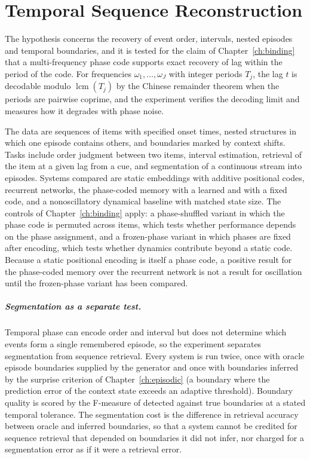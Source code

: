 \chapter{Temporal Sequence Reconstruction}\label{ch:sequence}

The hypothesis concerns the recovery of event order, intervals, nested episodes and temporal boundaries, and it is tested for the claim of Chapter~\ref{ch:binding} that a multi-frequency phase code supports exact recovery of lag within the period of the code. For frequencies $\omega_1,\dots,\omega_J$ with integer periods $T_j$, the lag $t$ is decodable modulo $\operatorname{lcm}(T_j)$ by the Chinese remainder theorem when the periods are pairwise coprime, and the experiment verifies the decoding limit and measures how it degrades with phase noise.

The data are sequences of items with specified onset times, nested structures in which one episode contains others, and boundaries marked by context shifts. Tasks include order judgment between two items, interval estimation, retrieval of the item at a given lag from a cue, and segmentation of a continuous stream into episodes. Systems compared are static embeddings with additive positional codes, recurrent networks, the phase-coded memory with a learned and with a fixed code, and a nonoscillatory dynamical baseline with matched state size. The controls of Chapter~\ref{ch:binding} apply: a phase-shuffled variant in which the phase code is permuted across items, which tests whether performance depends on the phase assignment, and a frozen-phase variant in which phases are fixed after encoding, which tests whether dynamics contribute beyond a static code. Because a static positional encoding is itself a phase code, a positive result for the phase-coded memory over the recurrent network is not a result for oscillation until the frozen-phase variant has been compared.

\paragraph{Segmentation as a separate test.} Temporal phase can encode order and interval but does not determine which events form a single remembered episode, so the experiment separates segmentation from sequence retrieval. Every system is run twice, once with oracle episode boundaries supplied by the generator and once with boundaries inferred by the surprise criterion of Chapter~\ref{ch:episodic} (a boundary where the prediction error of the context state exceeds an adaptive threshold). Boundary quality is scored by the F-measure of detected against true boundaries at a stated temporal tolerance. The segmentation cost is the difference in retrieval accuracy between oracle and inferred boundaries, so that a system cannot be credited for sequence retrieval that depended on boundaries it did not infer, nor charged for a segmentation error as if it were a retrieval error.

